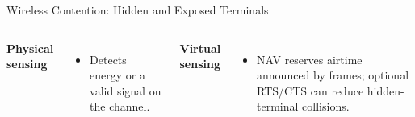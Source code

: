 \begin{frame}{Wireless Contention: Hidden and Exposed Terminals}
\begin{columns}[T,onlytextwidth]
\textbf{Physical sensing}
\begin{itemize}
    \item Detects energy or a valid signal on the channel.
\end{itemize}

\textbf{Virtual sensing}
\begin{itemize}
    \item NAV reserves airtime announced by frames; optional RTS/CTS can reduce hidden-terminal collisions.
\end{itemize}
\end{columns}

\end{frame}
